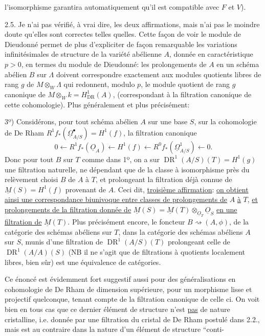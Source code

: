 l'isomorphisme garantira automatiquement qu'il est compatible avec $F$ et $V$).

2.5. Je n'ai pas vérifié, à vrai dire, les deux affirmations, mais n'ai pas le moindre doute qu'elles sont correctes telles quelles. Cette façon de voir le module de Dieudonné permet de plus d'expliciter de façon remarquable les variations infinitésimales de structure de la variété abélienne $A$, donnée\inserted{,} en caractéristique  $p>0$, en termes du module de Dieudonné: les prolongements de $A$ en un schéma abélien $B$ sur $\Lambda$ doivent correspondre exactement aux  modules quotients libres de rang $g$ de $M\otimes_W\Lambda$ qui redonnent, modulo $p$, le module quotient de rang $g$ canonique de $M\otimes_Wk=H^1_{\operatorname{DR}}(A)$, (correspondant à la filtration canonique de cette cohomologie). Plus généralement et plus précisément:

3º) Considérons, pour tout schéma abélien $A$ sur une base $S$, sur la cohomologie de De Rham $R^1f_*(\underline{\Omega}^{\bullet}_{A/S})=H^1(f)$, la filtration canonique
\[
0\longleftarrow R^1f_*(\underline{O}_A)\longleftarrow H^1(f)\longleftarrow R^0f_*(\underline{\Omega}^1_{A/S})\longleftarrow0.
\]
Donc pour tout $B$ sur $T$ comme dans 1º, on a sur  $\operatorname{DR}^1(A/S)(T)=H^1(g)$ une filtration naturelle, ne dépendant que de la classe à isomorphisme près du relèvement choisi $B$ de $A$ à $T$, et prolongeant la filtration déjà connue de  $\underline{M}(S)=H^1(f)$ provenant de $A$. Ceci dit, \uline{troisième affirmation}: \uline{on obtient ainsi une correspondance biunivoque entre classes de prolongements de} $A$ \uline{à} $T$, \uline{et prolongements de la filtration donnée de} $\underline{M}(S)=\underline{M}(T)\otimes_{\underline{O}_T}\underline{O}_S$ \uline{en une filtration de} $\underline{M}(T)$. Plus précisément encore, le foncteur $B\rightsquigarrow(A,\phi)$, de la catégorie des schémas abéliens  sur $T$, dans la catégorie des schémas abéliens  $A$ sur $S$, munis d'une filtration \inserted{$\phi$} de $\operatorname{DR}^1(A/S)(T)$ prolongeant celle de $\operatorname{DR}^1(A/A)(S)$ (NB il ne s'agit que de filtrations à quotients localement libres, bien sûr) est une équivalence de catégories.

Ce énoncé est évidemment fort suggestif aussi pour des généralisations en cohomologie de De Rham de dimension supérieure, pour un morphisme lisse et projectif quelconque, tenant compte de la filtration canonique de celle ci. On voit bien en tous cas que ce dernier élément de structure n'est \uline{pas} de nature cristalline, i.e. donnée par une filtration du cristal de De Rham postulé dans 2.2., mais est au contraire dans la nature d'un élément de structure ``conti-



